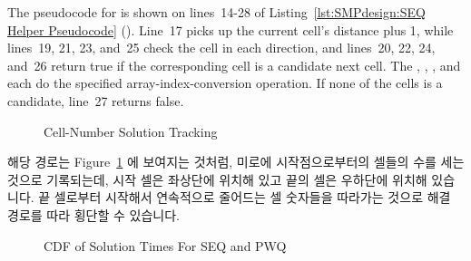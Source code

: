 The pseudocode for  is shown on lines~14-28
of Listing~\ref{lst:SMPdesign:SEQ Helper Pseudocode}
().
Line~17 picks up the current cell's distance plus 1,
while lines~19, 21, 23, and~25
check the cell in each direction, and lines~20, 22, 24, and~26
return true if the corresponding cell is a candidate next cell.
The , , , and 
each do the specified array-index-conversion operation.
If none of the cells is a candidate, line~27 returns false.
\fi

\begin{figure}[tb]
\centering
{}
\caption{Cell-Number Solution Tracking}
\label{fig:SMPdesign:Cell-Number Solution Tracking}
\end{figure}

해당 경로는 Figure~\ref{fig:SMPdesign:Cell-Number Solution Tracking} 에
보여지는 것처럼, 미로에 시작점으로부터의 셀들의 수를 세는 것으로 기록되는데,
시작 셀은 좌상단에 위치해 있고 끝의 셀은 우하단에 위치해 있습니다.
끝 셀로부터 시작해서 연속적으로 줄어드는 셀 숫자들을 따라가는 것으로 해결
경로를 따라 횡단할 수 있습니다.

\begin{figure}[tb]
\centering
{}
\caption{CDF of Solution Times For SEQ and PWQ}
\label{fig:SMPdesign:CDF of Solution Times For SEQ and PWQ}
\end{figure}

